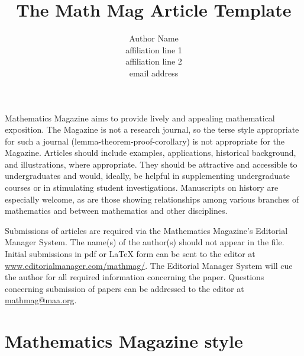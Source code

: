 \documentclass{book}
\theoremstyle{theorem}
\theoremstyle{definition}
\begin{document}
    \title{The Math Mag Article Template}

    \author{Author Name\\               %
        \scriptsize affiliation line 1\\    %
        affiliation line 2\\                %
        email address}                      %

    \maketitle

    \noindent  Mathematics Magazine aims to provide lively and appealing mathematical exposition. The Magazine is not a research journal, so the terse style appropriate for such a journal (lemma-theorem-proof-corollary) is not appropriate for the Magazine. Articles should include examples, applications, historical background, and illustrations, where appropriate. They should be attractive and accessible to undergraduates and would, ideally, be helpful in supplementing undergraduate courses or in stimulating student investigations. Manuscripts on history are especially welcome, as are those showing relationships among various branches of mathematics and between mathematics and other disciplines.

    Submissions of articles are required via the Mathematics Magazine's Editorial Manager System. The name(s) of the author(s) should not appear in the file. Initial submissions in pdf or LaTeX form can be sent to the editor at \href{http://www.editorialmanager.com/mathmag/}{\url{www.editorialmanager.com/mathmag/}}.
    The Editorial Manager System will cue the author for all required information concerning the paper. Questions concerning submission of papers can be addressed to the editor at \href{mathmag@maa.org}{\url{mathmag@maa.org}}.

    \section{Mathematics Magazine style}
\end{document}
